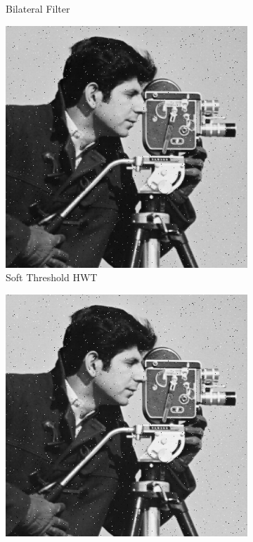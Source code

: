 \documentclass{article}\raggedbottom
\begin{document}
\begin{figure}[H]
\begin{subfigure}[b]{0.45\linewidth}
		\caption{Bilateral Filter}
	\end{subfigure}
	\begin{subfigure}[b]{0.45\linewidth}
		\includegraphics[width=\linewidth]{../../2_Software/data/IHWT_soft_sp.png}
		\caption{Soft Threshold HWT}
	\end{subfigure}
	\begin{subfigure}[b]{0.45\linewidth}
		\includegraphics[width=\linewidth]{../../2_Software/data/IHWT_hard_sp.png}

\end{subfigure}
\end{figure}
\end{document}
